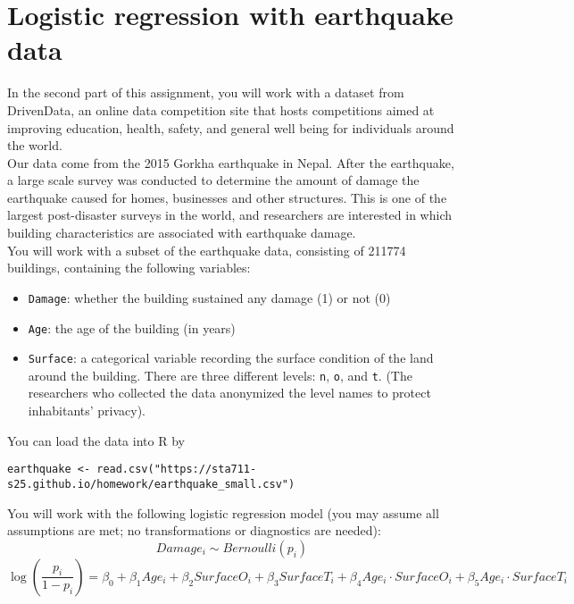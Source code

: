 \documentclass[11pt]{article}
\begin{document}
\section*{Logistic regression with earthquake data}

In the second part of this assignment, you will work with a dataset from DrivenData, an online data competition site that hosts competitions aimed at improving education, health, safety, and general well being for individuals around the world.\\

\noindent Our data come from the 2015 Gorkha earthquake in Nepal. After the earthquake, a large scale survey was conducted to determine the amount of damage the earthquake caused for homes, businesses and other structures. This is one of the largest post-disaster surveys in the world, and researchers are interested in which building characteristics are associated with earthquake damage.\\

\noindent You will work with a subset of the earthquake data, consisting of 211774 buildings, containing the following variables:
\begin{itemize}
\item \verb;Damage;: whether the building sustained any damage (1) or not (0)

\item \verb;Age;: the age of the building (in years)

\item \verb;Surface;: a categorical variable recording the surface condition of the land around the building. There are three different levels: \verb;n;, \verb;o;, and \verb;t;. (The researchers who collected the data anonymized the level names to protect inhabitants' privacy).
\end{itemize}

\noindent You can load the data into R by
\begin{verbatim}
earthquake <- read.csv("https://sta711-s25.github.io/homework/earthquake_small.csv")
\end{verbatim}

\noindent You will work with the following logistic regression model (you may assume all assumptions are met; no transformations or diagnostics are needed):
$$Damage_i \sim Bernoulli(p_i)$$
$$\log \left( \dfrac{p_i}{1 - p_i} \right) = \beta_0 + \beta_1 Age_i + \beta_2 SurfaceO_i + \beta_3 SurfaceT_i + \beta_4 Age_i \cdot SurfaceO_i + \beta_5 Age_i \cdot SurfaceT_i$$
\end{document}
